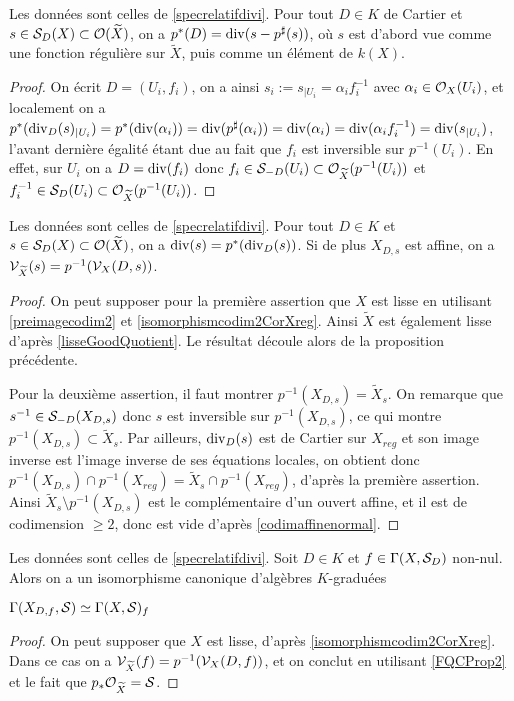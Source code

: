 \begin{prop}\label{pstarPrincipalCartier}
Les données sont celles de \ref{specrelatifdivi}. Pour tout $D\in K$ de Cartier et $s\in\mathcal{S}_D(X)\subset \mathcal{O}(\widetilde{X})$, on a $p^*(D)=\operatorname{div}(s-p^\sharp(s))$, où $s$ est d'abord vue comme une fonction régulière sur $\widetilde{X}$, puis comme un élément de $k(X)$.
\end{prop}
\begin{proof}
On écrit $D=(U_i, f_i)$, on a ainsi $s_i:=s_{|U_i}=\alpha_i f_i^{-1}$ avec $\alpha_i\in \mathcal{O}_X(U_i)$, et localement on a $p^*(\operatorname{div}_D(s)_{|U_i})=p^*(\operatorname{div}(\alpha_i))=\operatorname{div}(p^\sharp(\alpha_i))=\operatorname{div}(\alpha_i)=\operatorname{div}(\alpha_i f_i^{-1})=\operatorname{div}(s_{|U_i})$, l'avant dernière égalité étant due au fait que $f_i$ est inversible sur $p^{-1}(U_i)$. En effet, sur $U_i$ on a $D=\operatorname{div}(f_i)$ donc $f_i\in \mathcal{S}_{-D}(U_i)\subset\mathcal{O}_{\widetilde{X}}(p^{-1}(U_i))$ et $f_i^{-1}\in \mathcal{S}_D(U_i)\subset\mathcal{O}_{\widetilde{X}}(p^{-1}(U_i))$.
\end{proof}

\begin{prop}\label{pstarprincipal}
Les données sont celles de \ref{specrelatifdivi}. Pour tout $D\in K$ et $s\in\mathcal{S}_D(X)\subset \mathcal{O}(\widetilde{X})$, on a $\operatorname{div}(s)=p^*(\operatorname{div}_D(s))$. Si de plus $X_{D,s}$ est affine, on a $\mathcal{V}_{\widetilde{X}}(s)=p^{-1}(\mathcal{V}_X(D,s))$.
\end{prop}
\begin{proof}
On peut supposer pour la première assertion que $X$ est lisse en utilisant \ref{preimagecodim2} et \ref{isomorphismcodim2CorXreg}. Ainsi $\widetilde{X}$ est également lisse d'après \ref{lisseGoodQuotient}. Le résultat découle alors de la proposition précédente.

Pour la deuxième assertion, il faut montrer $p^{-1}(X_{D,s})=\widetilde{X}_s$. On remarque que $s^{-1}\in \mathcal{S}_{-D}(X_{D,s})$ donc $s$ est inversible sur $p^{-1}(X_{D,s})$, ce qui montre $p^{-1}(X_{D,s})\subset \widetilde{X}_s$. Par ailleurs, $\operatorname{div}_D(s)$ est de Cartier sur $X_{reg}$ et son image inverse est l'image inverse de ses équations locales, on obtient donc $p^{-1}(X_{D,s})\cap p^{-1}(X_{reg})=\widetilde{X}_s \cap p^{-1}(X_{reg})$, d'après la première assertion. Ainsi $\widetilde{X}_s \setminus p^{-1}(X_{D,s})$ est le complémentaire d'un ouvert affine, et il est de codimension $\geq 2$, donc est vide d'après \ref{codimaffinenormal}.
\end{proof}

\begin{prop}\label{CoxIsomorphismLocalisation}
Les données sont celles de \ref{specrelatifdivi}. Soit $D\in K$ et $f\in\Gamma(X,\mathcal{S}_D)$ non-nul. Alors on a un isomorphisme canonique d'algèbres $K$-graduées
\begin{center}
$\Gamma(X_{D,f},\mathcal{S})\simeq \Gamma(X,\mathcal{S})_f$
\end{center}
\end{prop}
\begin{proof}
On peut supposer que $X$ est lisse, d'après \ref{isomorphismcodim2CorXreg}. Dans ce cas on a $\mathcal{V}_{\widetilde{X}}(f)=p^{-1}(\mathcal{V}_X(D,f))$, et on conclut en utilisant \ref{FQCProp2} et le fait que $p_*\mathcal{O}_{\widetilde{X}}=\mathcal{S}$.
\end{proof}

